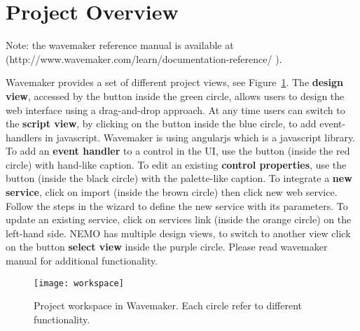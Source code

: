 \section{Project Overview}
Note: the wavemaker reference manual is available at (http://www.wavemaker.com/learn/documentation-reference/ ). 

Wavemaker provides a set of different project views, see Figure~\ref{fig:workspace}. The \textbf{design view}, accessed by the button inside the green circle, allows users to design the web interface using a drag-and-drop approach. At any time users can switch to the \textbf{script view}, by clicking on the button inside the blue circle, to add event-handlers in javascript. Wavemaker is using angularjs which is a javascript library. To add an \textbf{event handler} to a control in the UI, use the button (inside the red circle) with hand-like caption. To edit an existing \textbf{control properties}, use the button (inside the black circle) with the palette-like caption.  
To integrate a \textbf{new service}, click on import (inside the brown circle) then click new web service. Follow the steps in the wizard to define the new service with its parameters. To update an existing service, click on services link (inside the orange circle) on the left-hand side. NEMO has multiple design views, to switch to another view click on the button \textbf{select view} inside the purple circle. Please read wavemaker manual for additional functionality.

\begin{figure}[H]
\centering
\texttt{[image: workspace]}
\caption{
Project workspace in Wavemaker. Each circle refer to different functionality.
}   %
\label{fig:workspace}
\end{figure}